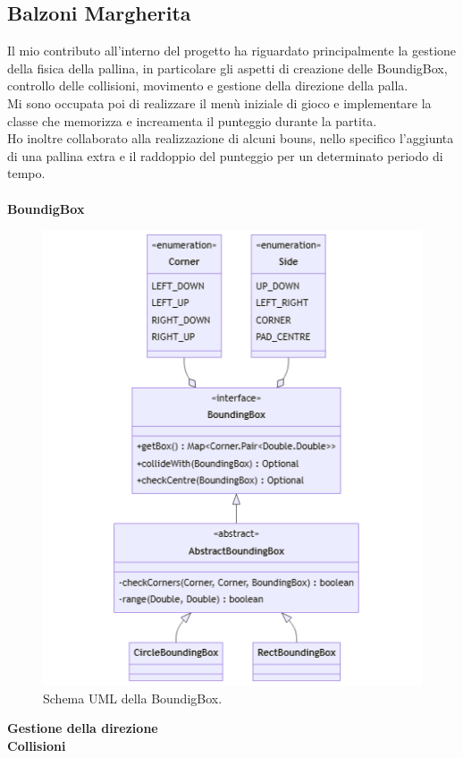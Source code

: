 \documentclass[a4paper,12pt]{report}
\begin{document}
\subsection{Balzoni Margherita}
Il mio contributo all'interno del progetto ha riguardato principalmente la gestione della fisica della pallina, in particolare gli aspetti di creazione delle BoundigBox, controllo delle collisioni, movimento e gestione della direzione della palla.
\\Mi sono occupata poi di realizzare il menù iniziale di gioco e implementare la classe che memorizza e increamenta il punteggio durante la partita.
\\Ho inoltre collaborato alla realizzazione di alcuni bouns, nello specifico l'aggiunta di una pallina extra e il raddoppio del punteggio per un determinato periodo di tempo.\\\\
\textbf{BoundigBox}\\
\begin{figure}[H]
    \centering{}
    \includegraphics[scale=0.6]{images/BoundingBox.png}
    \caption{Schema UML della BoundigBox.}
    \label{images:BoundigBox}
\end{figure}
\textbf{Gestione della direzione}\\
\textbf{Collisioni}\\
\pagebreak
\end{document}
